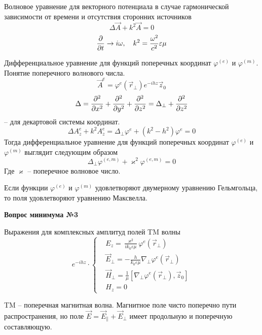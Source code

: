 \documentclass[a4paper,14pt]{extarticle}
\renewcommand{\phi}{\varphi}
\renewcommand{\epsilon}{\varepsilon}
\renewcommand{\kappa}{\varkappa}
\newcommand{\ticket}[1] {
\newpage
\hypertarget{num#1}{}
\begin{center}
	\textbf{Вопрос минимума №#1 }
\end{center}
}
\begin{document}
	Волновое уравнение для векторного потенциала в случае гармонической зависимости от времени и отсутствия сторонних источников
\begin{equation}
	\Delta\vec{A} + k^2 \vec{A}=0
\end{equation}
\begin{equation}
	\pdv{}{t} \to i\omega, \quad k^2=\frac{\omega^2}{c^2}\epsilon\mu
\end{equation}
	
	Дифференциальное уравнение для функций поперечных координат $\phi^{(e)}$ и $\phi^{(m)}$. Понятие поперечного волнового числа.
\begin{equation}
	\vec{A}^e = \phi^e(\vec{r}_\perp)e^{-ihz}\vec{z}_0
\end{equation}
\begin{equation}
	\Delta = \pdv[2]{}{x}+\pdv[2]{}{y}+\pdv[2]{}{z}=\Delta_\perp+\pdv[2]{}{z}
\end{equation} -- для декартовой системы координат.
\begin{equation}
	\Delta A_z^e + k^2 A_z^e=\Delta_\perp\phi^e + (k^2-h^2)\phi^e=0
\end{equation}
	Тогда дифференциальное уравнение для функций поперечных координат $\phi^{(e)}$ и $\phi^{(m)}$  выглядит следующим образом
\begin{equation}
	\Delta_\perp\phi^{(e,m)} + \kappa^2\phi^{(e,m)}=0
\end{equation}
	Где $\kappa$ -- поперечное волновое число. 	
	
	Если функции $\phi^{(e)}$ и $\phi^{(m)}$ удовлетворяют двумерному уравнению Гельмгольца, то поля удовлетворяют уравнению Максвелла.






\ticket{3}

Выражения для комплексных амплитуд полей TM волны 
\begin{equation}
	e^{-ihz}\cdot\left\{
	\begin{aligned}
		&E_z = \frac{\kappa^2}{ik_0\epsilon\mu}\phi^e(\vec{r}_\perp)\\
		&\vec{E}_\perp = -\frac{h}{k_0\epsilon\mu}\nabla_\perp\phi^e(\vec{r}_\perp)\\
		&\vec{H}_\perp = \frac{1}{\mu}[\nabla_\perp\phi^e(\vec{r}_\perp),\vec{z}_0]\\
		&H_z = 0
	\end{aligned}\right.
\end{equation}


TM -- поперечная магнитная волна. Магнитное поле чисто поперечно пути распространения, но поле $\vec{E}=\vec{E}_\parallel+\vec{E}_\perp$ имеет продольную и поперечную составляющую.
\end{document}
